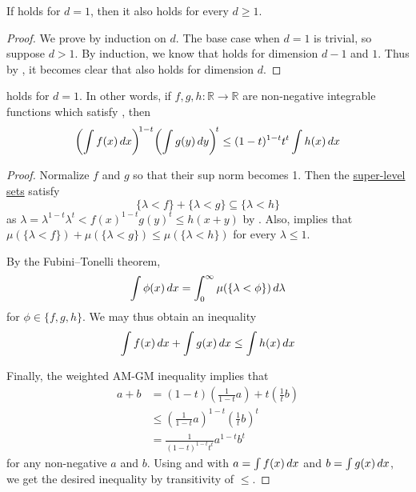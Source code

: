 \begin{corollary}
    If  holds for $d=1$, then it also holds for every $d\geq 1$.
\end{corollary}
\begin{proof}
    We prove by induction on $d$.
    The base case when $d=1$ is trivial, so suppose $d>1$.
    By induction, we know that  holds for dimension $d-1$ and $1$.
    Thus by , it becomes clear that  also holds for dimension $d$.
\end{proof}

\begin{lemma}
     holds for $d=1$. In other words,
    if $f,g,h:\mathbb{R}\to\mathbb{R}$ are non-negative integrable functions which satisfy ,
    then
    \[\biggl( \int f(x) \mathop{d\!} x \biggr)^{\!1-t} \biggl( \int g(y) \mathop{d\!} y \biggr)^{\!t} \le (1-t)^{1-t} t^{t} \int h(x) \mathop{d\!} x\]
\end{lemma}
\begin{proof}
    Normalize $f$ and $g$ so that their sup norm becomes 1.
    Then the \href{https://en.wikipedia.org/wiki/Level_set}{super-level sets} satisfy
    \[\{\lambda<f\}+\{\lambda<g\}\subseteq\{\lambda<h\}\]
    as $\lambda=\lambda^{1-t}\lambda^{t}<f(x)^{1-t}g(y)^{t}\leq h(x+y)$ by .
    Also,  implies that $\mu(\{\lambda<f\})+\mu(\{\lambda<g\})\leq\mu(\{\lambda<h\})$ for every $\lambda\leq 1$.

    By the Fubini--Tonelli theorem,
    \[\int\phi(x)\mathop{d\!} x=\int_{0}^{\infty}\mu(\{\lambda<\phi\})\mathop{d\!} \lambda\]
    for $\phi\in\{f,g,h\}$.
    We may thus obtain an inequality
    \begin{equation}
        \label{claim:int-ineq}
        \int f(x)\mathop{d\!} x+\int g(x)\mathop{d\!} x\leq \int h(x)\mathop{d\!} x
    \end{equation}

    Finally, the weighted AM-GM inequality implies that
    \begin{equation}
        \label{claim:am-gm-coro}
        \begin{split}
            a+b
            &=(1-t)\left(\frac{1}{1-t}a\right)+t\left(\frac{1}{t}b\right)\\
            &\leq\left(\frac{1}{1-t}a\right)^{1-t}\left(\frac{1}{t}b\right)^{t}\\
            &=\frac{1}{(1-t)^{1-t}t^{t}}a^{1-t}b^{t}
        \end{split}
    \end{equation}
    for any non-negative $a$ and $b$.
    Using  and  with $a=\int f(x)\mathop{d\!} x$ and $b=\int g(x)\mathop{d\!} x$, we get the desired inequality by transitivity of $\leq$.
\end{proof}
